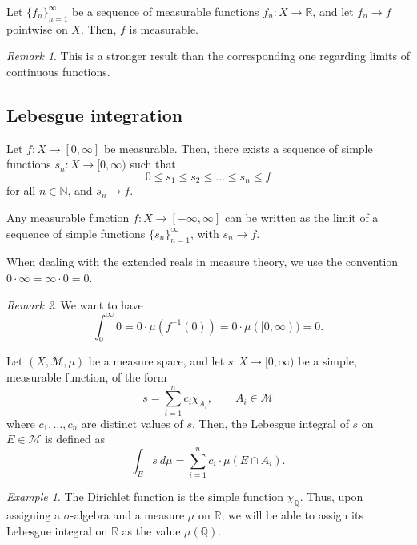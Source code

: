 \documentclass[11pt]{article}
\newcommand{\R}{\mathbb{R}}
\newcommand{\Q}{\mathbb{Q}}
\newcommand{\N}{\mathbb{N}}
\newcommand{\M}{\mathcal{M}}
\theoremstyle{definition}
\theoremstyle{remark}
\newtheorem*{remark}{Remark}
\newtheorem*{example}{Example}
\numberwithin{equation}{section}
\begin{document}
    \begin{theorem}
        Let $\{f_n\}_{n = 1}^\infty$ be a sequence of measurable functions $f_n\colon
        X \to \R$, and let $f_n \to f$ pointwise on $X$. Then, $f$ is measurable.
        \begin{remark}
            This is a stronger result than the corresponding one regarding limits of
            continuous functions.
        \end{remark}
    \end{theorem}



    \subsection{Lebesgue integration}

    \begin{theorem}
        Let $f\colon X \to [0, \infty]$ be measurable. Then, there exists a sequence
        of simple functions $s_n\colon X \to [0, \infty)$ such that \[
            0 \leq s_1 \leq s_2 \leq \dots \leq s_n \leq f
        \] for all $n \in \N$, and $s_n \to f$.
    \end{theorem}
    \begin{corollary}
        Any measurable function $f\colon X \to [-\infty, \infty]$ can be written as
        the limit of a sequence of simple functions $\{s_n\}_{n = 1}^\infty$, with
        $s_n \to f$.
    \end{corollary}

    \begin{definition}
        When dealing with the extended reals in measure theory, we use the convention
        $0\cdot \infty = \infty \cdot 0 = 0$.
        \begin{remark}
            We want to have \[
                \int_0^\infty 0 = 0\cdot \mu(f^{-1}(0)) = 0\cdot \mu([0, \infty)) =
                0.
            \]
        \end{remark}
    \end{definition}


    \begin{definition}
        Let $(X, \M, \mu)$ be a measure space, and let $s\colon X \to [0, \infty)$ be
        a simple, measurable function, of the form \[
            s = \sum_{i = 1}^n c_i\chi_{A_i}, \qquad A_i \in \M
        \] where $c_1, \dots, c_n$ are distinct values of $s$. Then, the Lebesgue
        integral of $s$ on $E \in \M$ is defined as \[
            \int_E s\:d\mu = \sum_{i = 1}^n c_i\cdot \mu(E \cap A_i).
        \]
    \end{definition}
    \begin{example}
        The Dirichlet function is the simple function $\chi_\Q$. Thus, upon assigning
        a $\sigma$-algebra and a measure $\mu$ on $\R$, we will be able to assign its
        Lebesgue integral on $\R$ as the value $\mu(\Q)$.
    \end{example}
\end{document}
